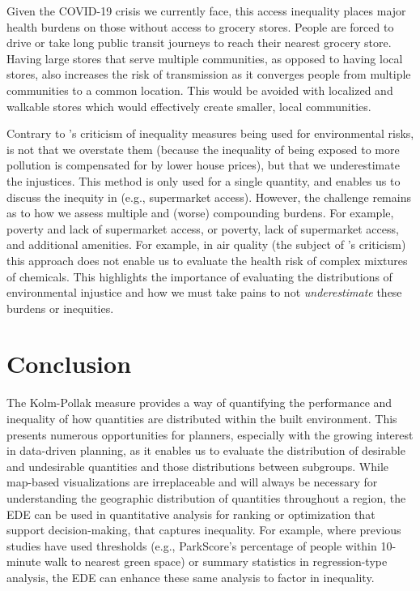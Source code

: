 \documentclass[final,3p,times,onecolumn,sort&compress]{elsarticle}
\begin{document}
Given the COVID-19 crisis we currently face, this access inequality places major health burdens on those without access to grocery stores.
People are forced to drive or take long public transit journeys to reach their nearest grocery store.
Having large stores that serve multiple communities, as opposed to having local stores, also increases the risk of transmission as it converges people from multiple communities to a common location.
This would be avoided with localized and walkable stores which would effectively create smaller, local communities.

Contrary to \cite{Cox2012-lg}'s criticism of inequality measures being used for environmental risks, is not that we overstate them (because the inequality of being exposed to more pollution is compensated for by lower house prices), but that we underestimate the injustices.
This method is only used for a single quantity, and enables us to discuss the inequity in (e.g., supermarket access). 
However, the challenge remains as to how we assess multiple and (worse) compounding burdens.
For example, poverty and lack of supermarket access, or poverty, lack of supermarket access, and additional amenities.
For example, in air quality (the subject of \cite{Cox2012-lg}'s criticism) this approach does not enable us to evaluate the health risk of complex mixtures of chemicals.
This highlights the importance of evaluating the distributions of environmental injustice and how we must take pains to not \textit{underestimate} these burdens or inequities.


\section{Conclusion}
The Kolm-Pollak measure provides a way of quantifying the performance and inequality of how quantities are distributed within the built environment.
This presents numerous opportunities for planners, especially with the growing interest in data-driven planning, as it enables us to evaluate the distribution of desirable and undesirable quantities and those distributions between subgroups.
While map-based visualizations are irreplaceable and will always be necessary for understanding the geographic distribution of quantities throughout a region, the EDE can be used in quantitative analysis for ranking or optimization that support decision-making, that captures inequality.
For example, where previous studies have used thresholds (e.g., ParkScore's percentage of people within 10-minute walk to nearest green space) or summary statistics in regression-type analysis, the EDE can enhance these same analysis to factor in inequality.
\end{document}
